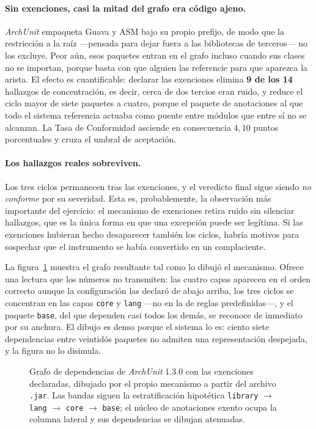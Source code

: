 \paragraph{Sin exenciones, casi la mitad del grafo era código ajeno.} \textit{ArchUnit} empaqueta Guava y ASM bajo su propio prefijo, de modo que la restricción a la raíz ---pensada para dejar fuera a las bibliotecas de terceros--- no los excluye. Peor aún, esos paquetes entran en el grafo incluso cuando sus clases no se importan, porque basta con que alguien las referencie para que aparezca la arista. El efecto es cuantificable: declarar las exenciones elimina \textbf{9 de los 14} hallazgos de concentración, es decir, cerca de dos tercios eran ruido, y reduce el ciclo mayor de siete paquetes a cuatro, porque el paquete de anotaciones al que todo el sistema referencia actuaba como puente entre módulos que entre sí no se alcanzan. La Tasa de Conformidad asciende en consecuencia $4{,}10$ puntos porcentuales y cruza el umbral de aceptación.

\paragraph{Los hallazgos reales sobreviven.} Los tres ciclos permanecen tras las exenciones, y el veredicto final sigue siendo \textit{no conforme} por su severidad. Esta es, probablemente, la observación más importante del ejercicio: el mecanismo de exenciones retira ruido sin silenciar hallazgos, que es la única forma en que una excepción puede ser legítima. Si las exenciones hubieran hecho desaparecer también los ciclos, habría motivos para sospechar que el instrumento se había convertido en un complaciente.

La figura~\ref{fig:archunit} muestra el grafo resultante tal como lo dibujó el mecanismo. Ofrece una lectura que los números no transmiten: las cuatro capas aparecen en el orden correcto aunque la configuración las declaró de abajo arriba, los tres ciclos se concentran en las capas \texttt{core} y \texttt{lang} ---no en la de reglas predefinidas---, y el paquete \texttt{base}, del que dependen casi todos los demás, se reconoce de inmediato por su anchura. El dibujo es denso porque el sistema lo es: ciento siete dependencias entre veintidós paquetes no admiten una representación despejada, y la figura no lo disimula.

\begin{figure}
\centering
{}
\caption{Grafo de dependencias de \textit{ArchUnit} 1.3.0 con las exenciones declaradas, dibujado por el propio mecanismo a partir del archivo \texttt{.jar}. Las bandas siguen la estratificación hipotética \texttt{library} $\rightarrow$ \texttt{lang} $\rightarrow$ \texttt{core} $\rightarrow$ \texttt{base}; el núcleo de anotaciones exento ocupa la columna lateral y sus dependencias se dibujan atenuadas.}
\label{fig:archunit}
\end{figure}

